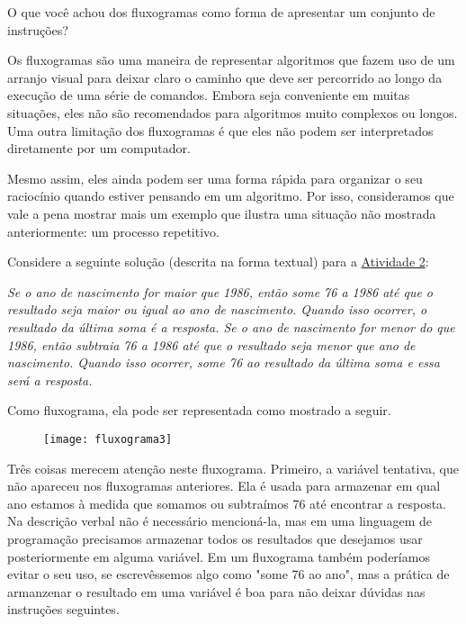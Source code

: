 \begin{reflection}
O que você achou dos fluxogramas como forma de apresentar um conjunto de instruções?
\end{reflection}

\label{comp-arr2}

Os fluxogramas são uma maneira de representar algoritmos que fazem uso de um arranjo visual para deixar claro o caminho que deve ser percorrido ao longo da execução de uma série de comandos. Embora seja conveniente em muitas situações, eles não são recomendados para algoritmos muito complexos ou longos. Uma outra limitação dos fluxogramas é que eles não podem ser interpretados diretamente por um computador.

Mesmo assim, eles ainda podem ser uma forma rápida para organizar o seu raciocínio quando estiver pensando em um algoritmo. Por isso, consideramos que vale a pena mostrar mais um exemplo que ilustra uma situação não mostrada anteriormente: um processo repetitivo.

Considere a seguinte solução (descrita na forma textual) para a \hyperref[comp-task2]{Atividade 2}:

\textit{Se o ano de nascimento for maior que 1986, então some 76 a 1986 até que o resultado seja maior ou igual ao ano de nascimento. Quando isso ocorrer, o resultado da última soma é a resposta. Se o ano de nascimento for menor do que 1986, então subtraia 76 a 1986 até que o resultado seja menor que ano de nascimento. Quando isso ocorrer, some 76 ao resultado da última soma e essa será a resposta.}

Como fluxograma, ela pode ser representada como mostrado a seguir.

\begin{figure}[H]
\centering

\texttt{[image: fluxograma3]}
\end{figure}

Três coisas merecem atenção neste fluxograma.
Primeiro, a variável tentativa, que não apareceu nos fluxogramas anteriores. Ela é usada para armazenar em qual ano estamos à medida que somamos ou subtraímos 76 até encontrar a resposta. Na descrição verbal não é necessário mencioná-la, mas em uma linguagem de programação precisamos armazenar todos os resultados que desejamos usar posteriormente em alguma variável. Em um fluxograma também poderíamos evitar o seu uso, se escrevêssemos algo como "some 76 ao ano", mas a prática de armanzenar o resultado em uma variável é boa para não deixar dúvidas nas instruções seguintes.

